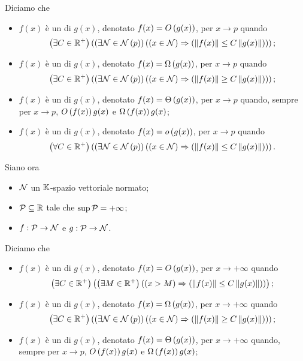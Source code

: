 \begin{Definition}
\begin{itemize}
	\end{itemize}
	Diciamo che
	\begin{itemize}
		\item $f(x)$ \`e un  di $g(x)$, denotato $f(x) = O \left ( g(x) \right )$, per $x \rightarrow p$ quando $$\Exists{C \in \RealPositive}{\Exists{\Neighborhood \in \Neighborhoods{\AccumulationPoint}}{\Implies{x \in \Neighborhood}{\Norm{f(x)} \leq C \Norm{g(x)}}}};$$
		\item $f(x)$ \`e un  di $g(x)$, denotato $f(x) = \Omega \left ( g(x) \right )$, per $x \rightarrow p$ quando $$\Exists{C \in \RealPositive}{\Exists{\Neighborhood \in \Neighborhoods{\AccumulationPoint}}{\Implies{x \in \Neighborhood}{\Norm{f(x)} \geq C \Norm{g(x)}}}};$$
		\item $f(x)$ \`e un  di $g(x)$, denotato $f(x) = \Theta \left ( g(x) \right )$, per $x \rightarrow p$ quando, sempre per $x \rightarrow p$, $O \left ( f(x) \right ){g(x)}$ e $\Omega \left ( f(x) \right ){g(x)}$;
		\item $f(x)$ \`e un  di $g(x)$, denotato $f(x) = o \left ( g(x) \right )$, per $x \rightarrow p$ quando $$\ForAll{C \in \RealPositive}{\Exists{\Neighborhood \in \Neighborhoods{\AccumulationPoint}}{\Implies{x \in \Neighborhood}{\Norm{f(x)} \leq C \Norm{g(x)}}}}.$$
	\end{itemize}
	\par Siano ora
	\begin{itemize}
		\item $\mathcal{N}$ un $\mathbb{K}$-spazio vettoriale normato;
		\item $\mathcal{P} \subseteq \mathbb{R}$ tale che $\sup{\mathcal{P}} = + \infty$;
		\item $f: \mathcal{P} \rightarrow \mathcal{N}$ e $g: \mathcal{P} \rightarrow \mathcal{N}$.
	\end{itemize}
	Diciamo che
	\begin{itemize}
		\item $f(x)$ \`e un  di $g(x)$, denotato $f(x) = O \left ( g(x) \right )$, per $x \rightarrow + \infty$ quando $$\Exists{C \in \RealPositive}{\Exists{M \in \RealPositive}{\Implies{x > M}{\Norm{f(x)} \leq C \Norm{g(x)}}}};$$
		\item $f(x)$ \`e un  di $g(x)$, denotato $f(x) = \Omega \left ( g(x) \right )$, per $x \rightarrow + \infty$ quando $$\Exists{C \in \RealPositive}{\Exists{\Neighborhood \in \Neighborhoods{\AccumulationPoint}}{\Implies{x \in \Neighborhood}{\Norm{f(x)} \geq C \Norm{g(x)}}}};$$
		\item $f(x)$ \`e un  di $g(x)$, denotato $f(x) = \Theta \left ( g(x) \right )$, per $x \rightarrow + \infty$ quando, sempre per $x \rightarrow p$, $O \left ( f(x) \right ){g(x)}$ e $\Omega \left ( f(x) \right ){g(x)}$;

\end{itemize}
\end{Definition}
